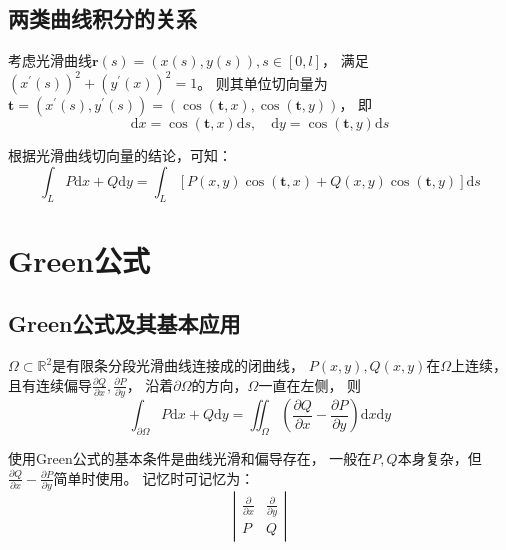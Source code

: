 \subsection{两类曲线积分的关系}

\begin{theorem}[光滑曲线切向量]
  考虑光滑曲线$\mathbf{r}(s) = (x(s),y(s)), s \in [0,l]$，
  满足$(x^{\prime}(s))^2 + (y^{\prime}(x))^2 = 1$。
  则其单位切向量为$\mathbf{t} = (x^{\prime}(s), y^{\prime}(s)) = (\cos(\mathbf{t},x), \cos (\mathbf{t},y))$，
  即
  \begin{equation*}
    \mathrm{d} x = \cos (\mathbf{t},x)\mathrm{d} s, \quad \mathrm{d} y = \cos(\mathbf{t},y)\mathrm{d} s
  \end{equation*}
\end{theorem}

\begin{theorem}[两类曲线积分的关系]
  根据光滑曲线切向量的结论，可知：
  \begin{equation*}
    \int_L P\mathrm{d} x + Q\mathrm{d} y = \int_L \left[ P(x,y)\cos(\mathbf{t},x) + Q(x,y) \cos (\mathbf{t},y) \right]\mathrm{d} s
  \end{equation*}
\end{theorem}



\section{Green公式}

\subsection{Green公式及其基本应用}

\begin{theorem}[Green公式]
  $\Omega \subset \mathbb{R}^2$是有限条分段光滑曲线连接成的闭曲线，
  $P(x,y),Q(x,y)$在$\Omega$上连续，
  且有连续偏导$\frac{\partial Q}{\partial x}, \frac{\partial P}{\partial y}$，
  沿着$\partial \Omega$的方向，$\Omega$一直在左侧，
  则
  \begin{equation*}
    \int _{\partial \Omega} P\mathrm{d}x + Q \mathrm{d}y = \iint _{\Omega} (\frac{\partial Q}{\partial x} - \frac{\partial P}{\partial y})\mathrm{d}x\mathrm{d}y
  \end{equation*}
\end{theorem}

\begin{note}
  使用Green公式的基本条件是曲线光滑和偏导存在，
  一般在$P,Q$本身复杂，但$\frac{\partial Q}{\partial x} - \frac{\partial P}{\partial y}$简单时使用。
  记忆时可记忆为：
  \begin{equation*}
    \left|
      \begin{array}{cc}
        \frac{\partial }{\partial x}&\frac{\partial}{\partial y}\\
        P&Q
      \end{array}
    \right|
  \end{equation*}
\end{note}

